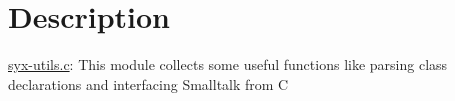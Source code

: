 \hypertarget{syx_utils_sec}{}\section{Description}\label{syx_utils_sec}
\hyperlink{syx-utils_8c}{syx-utils.c}: This module collects some useful functions like parsing class declarations and interfacing Smalltalk from C 